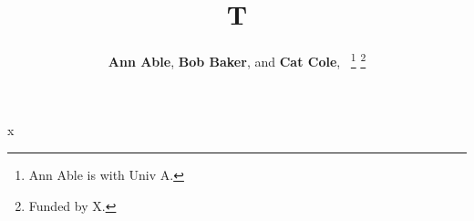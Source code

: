 \documentclass[journal]{IEEEtran}
\begin{document}
\title{T}
\author{{\textbf{Ann Able}, \textbf{Bob Baker}, and \textbf{Cat Cole},~}
\thanks{Ann Able is with Univ A.}
\thanks{Funded by X.}
}
\maketitle
x
\end{document}
